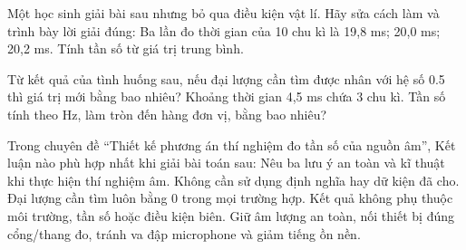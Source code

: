 \begin{ex}
Một học sinh giải bài sau nhưng bỏ qua điều kiện vật lí. Hãy sửa cách làm và trình bày lời giải đúng: Ba lần đo thời gian của 10 chu kì là 19,8 ms; 20,0 ms; 20,2 ms. Tính tần số từ giá trị trung bình.
\choiceTF

\end{ex}

\begin{ex}
Từ kết quả của tình huống sau, nếu đại lượng cần tìm được nhân với hệ số 0.5 thì giá trị mới bằng bao nhiêu? Khoảng thời gian 4,5 ms chứa 3 chu kì. Tần số tính theo Hz, làm tròn đến hàng đơn vị, bằng bao nhiêu?
\end{ex}

\begin{ex}
Trong chuyên đề “Thiết kế phương án thí nghiệm đo tần số của nguồn âm”, Kết luận nào phù hợp nhất khi giải bài toán sau: Nêu ba lưu ý an toàn và kĩ thuật khi thực hiện thí nghiệm âm.
\choice
{Không cần sử dụng định nghĩa hay dữ kiện đã cho.}
{Đại lượng cần tìm luôn bằng 0 trong mọi trường hợp.}
{Kết quả không phụ thuộc môi trường, tần số hoặc điều kiện biên.}
{\True Giữ âm lượng an toàn, nối thiết bị đúng cổng/thang đo, tránh va đập microphone và giảm tiếng ồn nền.}
\end{ex}

